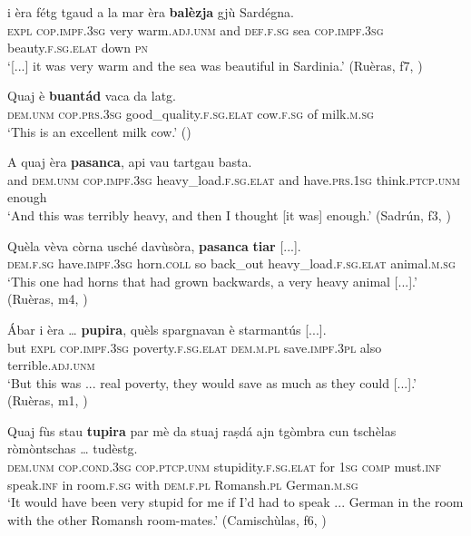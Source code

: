  
\ea\label{ex:balezja1}
\gll  [...] i èra fétg tgaud a la mar èra \textbf{balèzja} gjù Sardégna.\\
{} \textsc{expl} \textsc{cop.impf.3sg} very warm.\textsc{adj.unm} and \textsc{def.f.sg} sea \textsc{cop.impf.3sg} beauty.\textsc{f.sg.elat} down \textsc{pn}\\
\glt `[...] it was very warm and the sea was beautiful in Sardinia.' (Ruèras, f7, )
\z

\ea\label{ex:buantad1}
\gll  Quaj è \textbf{buantád} vaca da latg. \\
\textsc{dem.unm} \textsc{cop.prs.3sg} good\_quality.\textsc{f.sg.elat} cow.\textsc{f.sg} of milk.\textsc{m.sg}\\
\glt `This is an excellent milk cow.' ()
\z

\ea
\label{ex:pasanca1}
\gll  A quaj èra \textbf{pasanca}, api vau tartgau basta.\\
and \textsc{dem.unm} \textsc{cop.impf.3sg} heavy\_load.\textsc{f.sg.elat} and have.\textsc{prs.1sg} think.\textsc{ptcp.unm} enough  \\
\glt `And this was terribly heavy, and then I thought [it was] enough.' (Sadrún, f3, )
\z

\ea
\label{ex:pasanca2}
	\gll  Quèla vèva còrna usché davùsòra, \textbf{pasanca} \textbf{tiar} [...].  \\
\textsc{dem.f.sg} have.\textsc{impf.3sg} horn.\textsc{coll} so back\_out heavy\_load.\textsc{f.sg.elat} animal.\textsc{m.sg} \\
\glt `This one had horns that had grown backwards, a very heavy animal [...].' (Ruèras, m4, )
\z

\ea\label{ex:pupira1}
\gll   Ábar i èra … \textbf{pupira}, quèls spargnavan è starmantús [...].\\
but \textsc{expl}  \textsc{cop.impf.3sg} {} poverty.\textsc{f.sg.elat} \textsc{dem.m.pl} save.\textsc{impf.3pl} also terrible.\textsc{adj.unm}\\
\glt `But this was ... real poverty, they would save as much as they could [...].' (Ruèras, m1, )
\z

\ea
\label{ex:tupira1}
\gll    Quaj fùs stau \textbf{tupira} par mè da stuaj raṣdá ajn tgòmbra cun tschèlas ròmòntschas … tudèstg.\\
\textsc{dem.unm} \textsc{cop.cond.3sg} \textsc{cop.ptcp.unm} stupidity.\textsc{f.sg.elat}  for \textsc{1sg} \textsc{comp} must.\textsc{inf} speak.\textsc{inf} in room.\textsc{f.sg} with \textsc{dem.f.pl} Romansh.\textsc{pl} {} German.\textsc{m.sg}\\
\glt `It would have been very stupid for me if I'd had to speak ... German in the room with the other Romansh room-mates.' (Camischùlas, f6, )
\z

